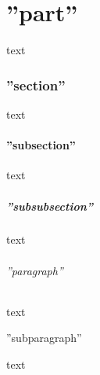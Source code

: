 \documentclass{report}
\begin{document}
\part{''part''} text \par
\section{''section''} text \par
\subsection{''subsection''} text \par
\subsubsection{''subsubsection''} text 	\par
\paragraph{''paragraph''} text \par
\subparagraph{''subparagraph''} text\par
\end{document}

